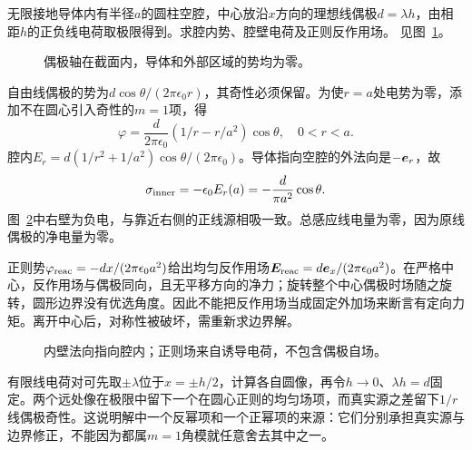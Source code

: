 \begin{example}[圆柱空腔中心的线偶极]\label{ex:es2-e10}
无限接地导体内有半径$a$的圆柱空腔，中心放沿$x$方向的理想线偶极$d=\lambda h$，由相距$h$的正负线电荷取极限得到。求腔内势、腔壁电荷及正则反作用场。 见图~\ref{fig:es2-e10-q}。
\end{example}

\begin{figure}[H]\centering
{}
\caption{偶极轴在截面内，导体和外部区域的势均为零。}\label{fig:es2-e10-q}
\end{figure}
\begin{solution}
自由线偶极的势为$d\cos\theta/(2\pi\epsilon_0r)$，其奇性必须保留。为使$r=a$处电势为零，添加不在圆心引入奇性的$m=1$项，得
\[\boxed{\varphi=\frac d{2\pi\epsilon_0}(1/r-r/a^2)\cos\theta},\quad 0<r<a.
\]
腔内$E_r=d(1/r^2+1/a^2)\cos\theta/(2\pi\epsilon_0)$。导体指向空腔的外法向是$-\bm{e}_r$，故
\[\sigma_{\rm inner}=-\epsilon_0 E_r(a)=-\frac d{\pi a^2}\cos\theta.
\]
图~\ref{fig:es2-e10-s}中右壁为负电，与靠近右侧的正线源相吸一致。总感应线电量为零，因为原线偶极的净电量为零。

正则势$\varphi_{\rm reac}=-dx/(2\pi\epsilon_0a^2)$给出均匀反作用场$\bm{E}_{\rm reac}=d\bm{e}_x/(2\pi\epsilon_0a^2)$。在严格中心，反作用场与偶极同向，且无平移方向的净力；旋转整个中心偶极时场随之旋转，圆形边界没有优选角度。因此不能把反作用场当成固定外加场来断言有定向力矩。离开中心后，对称性被破坏，需重新求边界解。
\begin{figure}[H]\centering
{}
\caption{内壁法向指向腔内；正则场来自诱导电荷，不包含偶极自场。}\label{fig:es2-e10-s}
\end{figure}


有限线电荷对可先取$\pm\lambda$位于$x=\pm h/2$，计算各自圆像，再令$h\to0$、$\lambda h=d$固定。两个远处像在极限中留下一个在圆心正则的均匀场项，而真实源之差留下$1/r$线偶极奇性。这说明解中一个反幂项和一个正幂项的来源：它们分别承担真实源与边界修正，不能因为都属$m=1$角模就任意舍去其中之一。
\end{solution}

